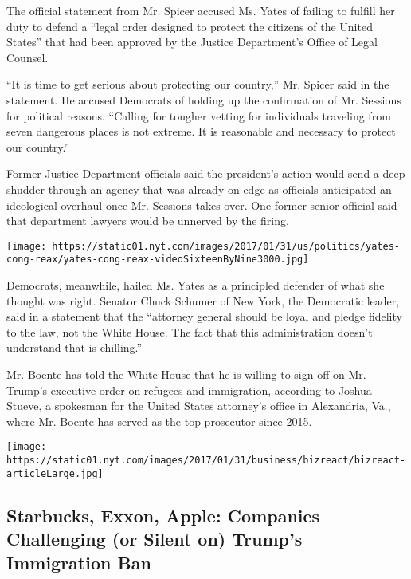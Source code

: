 The official statement from Mr. Spicer accused Ms. Yates of failing to
fulfill her duty to defend a ``legal order designed to protect the
citizens of the United States'' that had been approved by the Justice
Department's Office of Legal Counsel.

``It is time to get serious about protecting our country,'' Mr. Spicer
said in the statement. He accused Democrats of holding up the
confirmation of Mr. Sessions for political reasons. ``Calling for
tougher vetting for individuals traveling from seven dangerous places is
not extreme. It is reasonable and necessary to protect our country.''

Former Justice Department officials said the president's action would
send a deep shudder through an agency that was already on edge as
officials anticipated an ideological overhaul once Mr. Sessions takes
over. One former senior official said that department lawyers would be
unnerved by the firing.

\texttt{[image: https://static01.nyt.com/images/2017/01/31/us/politics/yates-cong-reax/yates-cong-reax-videoSixteenByNine3000.jpg]}

Democrats, meanwhile, hailed Ms. Yates as a principled defender of what
she thought was right. Senator Chuck Schumer of New York, the Democratic
leader, said in a statement that the ``attorney general should be loyal
and pledge fidelity to the law, not the White House. The fact that this
administration doesn't understand that is chilling.''

Mr. Boente has told the White House that he is willing to sign off on
Mr. Trump's executive order on refugees and immigration, according to
Joshua Stueve, a spokesman for the United States attorney's office in
Alexandria, Va., where Mr. Boente has served as the top prosecutor since
2015.

\href{https://www.nytimes.com/interactive/2017/business/trump-immigration-ban-company-reaction.html}{}

\texttt{[image: https://static01.nyt.com/images/2017/01/31/business/bizreact/bizreact-articleLarge.jpg]}

\hypertarget{starbucks-exxon-apple-companies-challenging-or-silent-on-trumps-immigration-ban}{%
\subsection{Starbucks, Exxon, Apple: Companies Challenging (or Silent
on) Trump's Immigration
Ban}\label{starbucks-exxon-apple-companies-challenging-or-silent-on-trumps-immigration-ban}}

